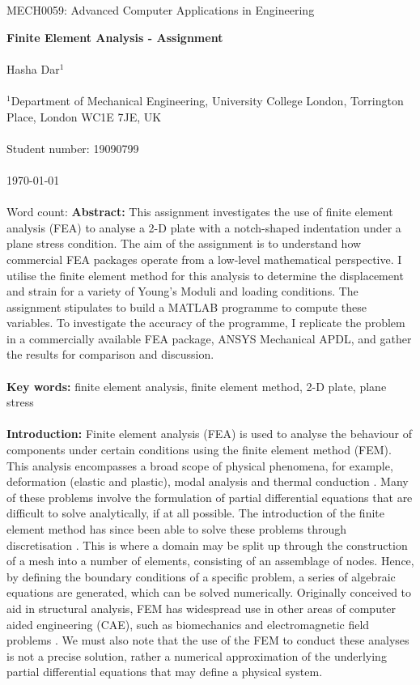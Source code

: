 \documentclass[11pt]{article}
\begin{document}
MECH0059: Advanced Computer Applications in Engineering

\textbf{Finite Element Analysis - Assignment}
\\
\\
Hasha Dar$^1$
\\
\\
$^1$Department of Mechanical Engineering, University College London, Torrington Place, London WC1E 7JE, UK
\\
\\
Student number: 19090799
\\
\\
\today
\\
\\
Word count:
\newpage
\textbf{Abstract:}
This assignment investigates the use of finite element analysis (FEA) to analyse a 2-D plate with a notch-shaped indentation under a plane stress condition. The aim of the assignment is to understand how commercial FEA packages operate from a low-level mathematical perspective. I utilise the finite element method for this analysis to determine the displacement and strain for a variety of Young's Moduli and loading conditions. The assignment stipulates to build a MATLAB programme to compute these variables. To investigate the accuracy of the programme, I replicate the problem in a commercially available FEA package, ANSYS Mechanical APDL, and gather the results for comparison and discussion.
\\
\\
\textbf{Key words:} finite element analysis, finite element method, 2-D plate, plane stress
\\
\\
\textbf{Introduction:}
Finite element analysis (FEA) is used to analyse the behaviour of components under certain conditions using the finite element method (FEM). This analysis encompasses a broad scope of physical phenomena, for example, deformation (elastic and plastic), modal analysis and thermal conduction \cite{twi}. Many of these problems involve the formulation of partial differential equations that are difficult to solve analytically, if at all possible. The introduction of the finite element method has since been able to solve these problems through discretisation \cite{KNOWLES1984134}. This is where a domain may be split up through the construction of a mesh into a number of elements, consisting of an assemblage of nodes. Hence, by defining the boundary conditions of a specific problem, a series of algebraic equations are generated, which can be solved numerically. Originally conceived to aid in structural analysis, FEM has widespread use in other areas of computer aided engineering (CAE), such as biomechanics and electromagnetic field problems \cite{seshu2003textbook}. We must also note that the use of the FEM to conduct these analyses is not a precise solution, rather a numerical approximation of the underlying partial differential equations that may define a physical system.
\end{document}
